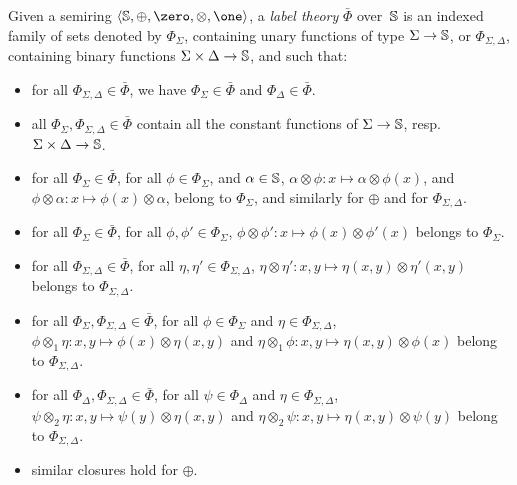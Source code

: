 Given a semiring $\< \Semiring, \oplus, \zero, \otimes, \one>$,
a \emph{label theory} $\bar\Phi$ over~$\mathbb{S}$
is an indexed family of %
sets denoted by
$\Phi_\Sigma$, %
containing unary functions of type $\Sigma \to \mathbb{S}$, %
or $\Phi_{\Sigma, \Delta}$, containing binary functions $\Sigma \times \Delta \to \mathbb{S}$,
and such that:
\begin{itemize}
\item %
     for all $\Phi_{\Sigma, \Delta} \in \bar\Phi$, we have
     $\Phi_{\Sigma} \in \bar\Phi$ and ${\Phi_{\Delta} \in \bar\Phi}$.
%
\item %
    all $\Phi_{\Sigma}, \Phi_{\Sigma, \Delta}\in \bar\Phi$ contain all the constant functions of 
    $\Sigma \to \mathbb{S}$, resp. ${\Sigma \times \Delta  \to \mathbb{S}}$.%
%
\item %
      for all $\Phi_{\Sigma} \in \bar\Phi$, 
      for all $\phi \in \Phi_\Sigma$, and $\alpha \in \mathbb{S}$,
      $\alpha \otimes \phi : x \mapsto \alpha \otimes \phi(x)$,
      and $\phi \otimes \alpha : x \mapsto \phi(x) \otimes \alpha$,  %
      belong to $\Phi_\Sigma$, and similarly for $\oplus$
      and for $\Phi_{\Sigma, \Delta}$.
%
\item %
      for all $\Phi_{\Sigma} \in \bar\Phi$, 
      for all $\phi, \phi' \in \Phi_\Sigma$,
      $\phi \otimes \phi': x \mapsto \phi(x) \otimes \phi'(x)$ belongs to $\Phi_\Sigma$.
%
\item %
	  for all $\Phi_{\Sigma, \Delta} \in \bar\Phi$,
      for all $\eta, \eta' \in \Phi_{\Sigma, \Delta}$,
      $\eta \otimes \eta': x, y \mapsto \eta(x, y) \otimes \eta'(x, y)$ belongs to $\Phi_{\Sigma, \Delta}$.
%
\item %
      for all $\Phi_{\Sigma}, \Phi_{\Sigma, \Delta} \in \bar\Phi$,
      for all $\phi \in \Phi_\Sigma$ and $\eta \in \Phi_{\Sigma, \Delta}$,
      $\phi \otimes_1 \eta: x, y \mapsto \phi(x) \otimes \eta(x, y)$ and
      $\eta \otimes_1 \phi: x, y \mapsto \eta(x, y) \otimes \phi(x)$
      belong to $\Phi_{\Sigma, \Delta}$.
%
\item %
      for all $\Phi_{\Delta}, \Phi_{\Sigma, \Delta} \in \bar\Phi$,
      for all $\psi \in \Phi_\Delta$ and $\eta \in \Phi_{\Sigma, \Delta}$,
      $\psi \otimes_2 \eta: x, y \mapsto \psi(y) \otimes \eta(x, y)$ and
      $\eta \otimes_2 \psi: x, y \mapsto \eta(x, y) \otimes \psi(y)$
      belong to $\Phi_{\Sigma, \Delta}$.
%
\item %
      similar closures hold for $\oplus$.
\end{itemize}


